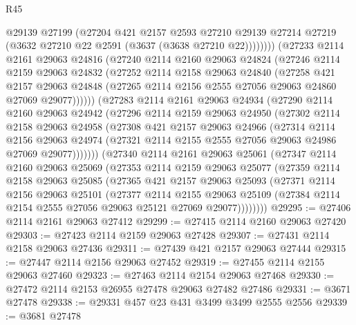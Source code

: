 \begin{lexlean}{R45}
\begin{coremodule}
            @29139
            @27199
            (@27204
              @421
              @2157
              @2593
              @27210
              @29139
              @27214
              @27219
              (@3632 @27210 @22 @2591 (@3637 (@3638 @27210 @22))))))))
    (@27233
      @2114
      @2161
      @29063
      @24816
      (@27240
        @2114
        @2160
        @29063
        @24824
        (@27246
          @2114
          @2159
          @29063
          @24832
          (@27252
            @2114
            @2158
            @29063
            @24840
            (@27258
              @421
              @2157
              @29063
              @24848
              (@27265 @2114 @2156 @2555 @27056 @29063 @24860 @27069 @29077))))))
    (@27283
      @2114
      @2161
      @29063
      @24934
      (@27290
        @2114
        @2160
        @29063
        @24942
        (@27296
          @2114
          @2159
          @29063
          @24950
          (@27302
            @2114
            @2158
            @29063
            @24958
            (@27308
              @421
              @2157
              @29063
              @24966
              (@27314
                @2114
                @2156
                @29063
                @24974
                (@27321 @2114 @2155 @2555 @27056 @29063 @24986 @27069 @29077)))))))
    (@27340
      @2114
      @2161
      @29063
      @25061
      (@27347
        @2114
        @2160
        @29063
        @25069
        (@27353
          @2114
          @2159
          @29063
          @25077
          (@27359
            @2114
            @2158
            @29063
            @25085
            (@27365
              @421
              @2157
              @29063
              @25093
              (@27371
                @2114
                @2156
                @29063
                @25101
                (@27377
                  @2114
                  @2155
                  @29063
                  @25109
                  (@27384 @2114 @2154 @2555 @27056 @29063 @25121 @27069 @29077))))))))
@29295 := @27406 @2114 @2161 @29063 @27412
@29299 := @27415 @2114 @2160 @29063 @27420
@29303 := @27423 @2114 @2159 @29063 @27428
@29307 := @27431 @2114 @2158 @29063 @27436
@29311 := @27439 @421 @2157 @29063 @27444
@29315 := @27447 @2114 @2156 @29063 @27452
@29319 := @27455 @2114 @2155 @29063 @27460
@29323 := @27463 @2114 @2154 @29063 @27468
@29330 := @27472 @2114 @2153 @26955 @27478 @29063 @27482 @27486
@29331 := @3671 @27478
@29338 := @29331 @457 @23 @431 @3499 @3499 @2555 @2556
@29339 := @3681 @27478

\end{coremodule}
\end{lexlean}
